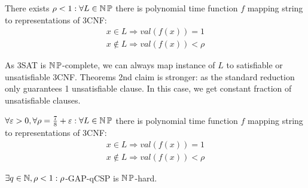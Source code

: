 \begin{theorem}[PCP 1]\label{pcp_1}
	There exists $\rho < 1: \forall L \in \operatorname{\operatorname{\mathbb{N}}\mathbb{P}}$ there is polynomial time function $f$ mapping string to representations of 3CNF:
	\begin{gather*}
		x \in L \Rightarrow val(f(x)) = 1 \\
		x \notin L \Rightarrow val(f(x)) < \rho
	\end{gather*}

	As 3SAT is $\operatorname{\operatorname{\mathbb{N}}\mathbb{P}}$-complete, we can always map instance of $L$ to satisfiable or unsatisfiable 3CNF.
	Theorems 2nd claim is stronger: as the standard reduction only guarantees 1 unsatisfiable clause.
	In this case, we get constant fraction of unsatisfiable clauses.
\end{theorem}

\begin{theorem}
	$\forall \varepsilon > 0, \forall \rho = \frac{7}{8} + \varepsilon: \forall L \in \operatorname{\operatorname{\mathbb{N}}\mathbb{P}}$ there is polynomial time function $f$ mapping string to representations of 3CNF:
	\begin{gather*}
		x \in L \Rightarrow val(f(x)) = 1 \\
		x \notin L \Rightarrow val(f(x)) < \rho
	\end{gather*}
\end{theorem}

\begin{theorem}[PCP 2]\label{pcp_2}
	$\exists q \in \operatorname{\mathbb{N}}, \rho < 1: \rho$-GAP-qCSP is $\operatorname{\operatorname{\mathbb{N}}\mathbb{P}}$-hard.
\end{theorem}

